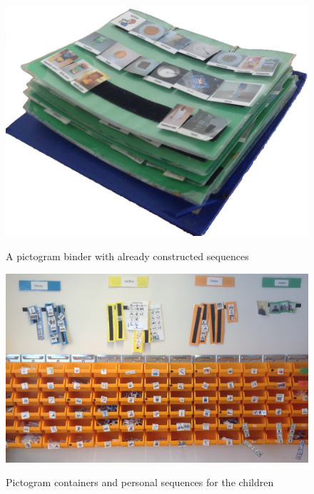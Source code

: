 \begin{figure}
\centering
\begin{minipage}{.7\textwidth}
\centering
\includegraphics[scale=0.17]{Pics/Sprint1/pictogram_binder.jpg}
\caption{A pictogram binder with already constructed sequences}
\label{fig:pictogram_binder}
\includegraphics[scale=0.14]{Pics/Sprint1/pictogram_containers.jpg}
\caption{Pictogram containers and personal sequences for the children}
\label{fig:pictogram_container}
\end{minipage}\hfill
\begin{minipage}{.3\textwidth}
\centering

\end{minipage}
\end{figure}
